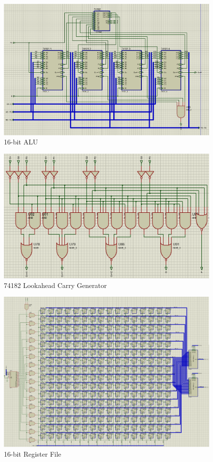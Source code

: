 \documentclass[11pt]{article}
\begin{document}
\begin{figure}[h!]
        \centering
        \includegraphics[width=17cm]{ALU.png}
        \caption{16-bit ALU}
        \label{fig:ALU}
\end{figure}

\begin{figure}[h!]
	\centering
	\includegraphics[width=13cm]{74182.png}
	\caption{74182 Lookahead Carry Generator}
	\label{fig:Carry}
\end{figure}

\begin{figure}[h!]
        \centering
        \includegraphics[width=17cm]{RegFile.png}
        \caption{16-bit Register File}
        \label{fig:REG}
\end{figure}
\end{document}
